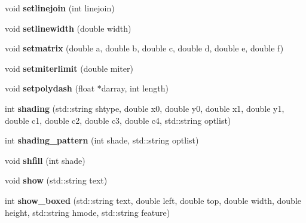 \begin{DoxyCompactItemize}
\item 
\hypertarget{classPDFlib_a2940808d00b87a16074c03a074057a17}{void {\bfseries setlinejoin} (int linejoin)}\label{classPDFlib_a2940808d00b87a16074c03a074057a17}

\item 
\hypertarget{classPDFlib_a383b08525b4c2acb9700e4e6e964a80a}{void {\bfseries setlinewidth} (double width)}\label{classPDFlib_a383b08525b4c2acb9700e4e6e964a80a}

\item 
\hypertarget{classPDFlib_a3a8cc387192e3a2d0eceb04b004328f0}{void {\bfseries setmatrix} (double a, double b, double c, double d, double e, double f)}\label{classPDFlib_a3a8cc387192e3a2d0eceb04b004328f0}

\item 
\hypertarget{classPDFlib_a63946229c4ae1512d5533459192b9198}{void {\bfseries setmiterlimit} (double miter)}\label{classPDFlib_a63946229c4ae1512d5533459192b9198}

\item 
\hypertarget{classPDFlib_ac49a72864c82f10043e66ba6c1b5a0fb}{void {\bfseries setpolydash} (float $\ast$darray, int length)}\label{classPDFlib_ac49a72864c82f10043e66ba6c1b5a0fb}

\item 
\hypertarget{classPDFlib_afdd28cd764f222f1c102323a42657643}{int {\bfseries shading} (std\-::string shtype, double x0, double y0, double x1, double y1, double c1, double c2, double c3, double c4, std\-::string optlist)}\label{classPDFlib_afdd28cd764f222f1c102323a42657643}

\item 
\hypertarget{classPDFlib_af7936c5fdacd6363b41811f02e6bead9}{int {\bfseries shading\-\_\-pattern} (int shade, std\-::string optlist)}\label{classPDFlib_af7936c5fdacd6363b41811f02e6bead9}

\item 
\hypertarget{classPDFlib_acc1378fc57dce8d3fbdd218aaa95f8dc}{void {\bfseries shfill} (int shade)}\label{classPDFlib_acc1378fc57dce8d3fbdd218aaa95f8dc}

\item 
\hypertarget{classPDFlib_aaa7923ae29e03873a5ef1e80156b75c6}{void {\bfseries show} (std\-::string text)}\label{classPDFlib_aaa7923ae29e03873a5ef1e80156b75c6}

\item 
\hypertarget{classPDFlib_af282c4e9f187a86ac103ec9438722040}{int {\bfseries show\-\_\-boxed} (std\-::string text, double left, double top, double width, double height, std\-::string hmode, std\-::string feature)}\label{classPDFlib_af282c4e9f187a86ac103ec9438722040}


\end{DoxyCompactItemize}
